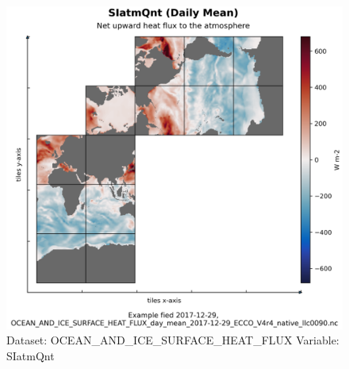 \begin{figure}[H]
\centering
\includegraphics[scale=0.55]{../images/plots/native_plots/Ocean_and_Sea-Ice_Surface_Heat_Fluxes/SIatmQnt.png}
\caption{Dataset: OCEAN\_AND\_ICE\_SURFACE\_HEAT\_FLUX Variable: SIatmQnt}
\label{tab:table-OCEAN_AND_ICE_SURFACE_HEAT_FLUX_SIatmQnt-Plot}
\end{figure}
\pagebreak
